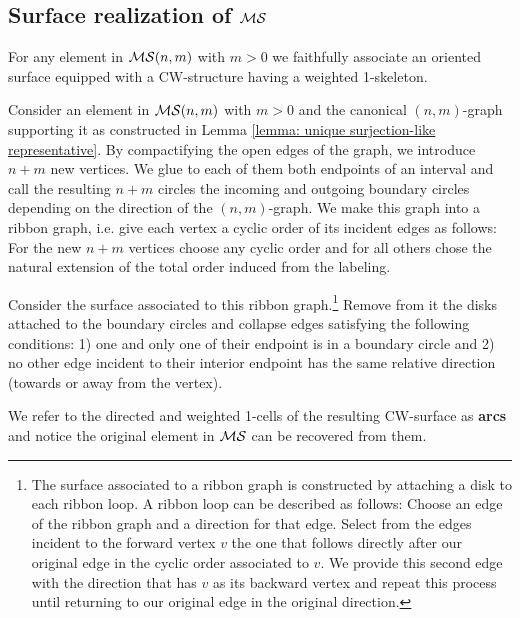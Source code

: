 \subsection{Surface realization of $\mathcal{MS}$} 

For any element in $\mathcal{MS}(n,m)$ with $m>0$ we faithfully associate an oriented surface equipped with a CW-structure having a weighted 1-skeleton. 

\begin{construction} \label{construction: arc surface}
	Consider an element in $\mathcal{MS}(n,m)$ with $m>0$ and the canonical $(n,m)$-graph supporting it as constructed in Lemma \ref{lemma: unique surjection-like representative}. By compactifying the open edges of the graph, we introduce $n+m$ new vertices. We glue to each of them both endpoints of an interval and call the resulting $n+m$ circles the incoming and outgoing boundary circles depending on the direction of the $(n,m)$-graph. We make this graph into a ribbon graph, i.e. give each vertex a cyclic order of its incident edges as follows: For the new $n+m$ vertices choose any cyclic order and for all others chose the natural extension of the total order induced from the labeling.	
	
	Consider the surface associated to this ribbon graph.\footnote{The surface associated to a ribbon graph is constructed by attaching a disk to each ribbon loop. A ribbon loop can be described as follows: Choose an edge of the ribbon graph and a direction for that edge. Select from the edges incident to the forward vertex $v$ the one that follows directly after our original edge in the cyclic order associated to $v$. We provide this second edge with the direction that has $v$ as its backward vertex and repeat this process until returning to our original edge in the original direction.} Remove from it the disks attached to the boundary circles and collapse edges satisfying the following conditions: 1) one and only one of their endpoint is in a boundary circle and 2) no other edge incident to their interior endpoint has the same relative direction (towards or away from the vertex).
	
	We refer to the directed and weighted 1-cells of the resulting CW-surface as \textbf{arcs} and notice the original element in $\mathcal{MS}$ can be recovered from them. \vspace*{-8pt}
\end{construction}

